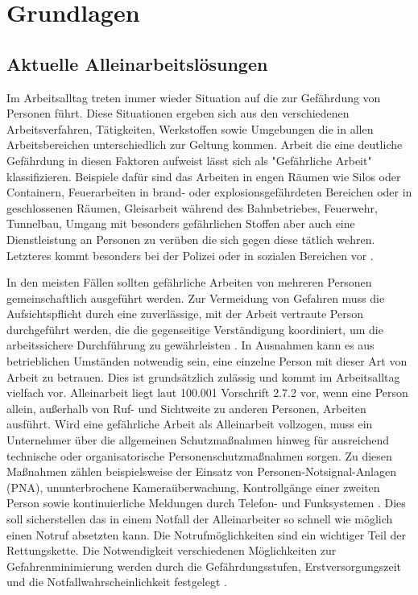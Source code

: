 \documentclass[thesis.tex]{subfiles}
\begin{document}
\chapter{Grundlagen}\label{chap:grundlagen}

\section{Aktuelle Alleinarbeitslösungen}\label{alleinarbeit}

Im Arbeitsalltag treten immer wieder Situation auf die zur Gefährdung von Personen führt.
Diese Situationen ergeben sich aus den verschiedenen Arbeitsverfahren, Tätigkeiten, Werkstoffen sowie Umgebungen die in allen Arbeitsbereichen unterschiedlich zur Geltung kommen.
Arbeit die eine deutliche Gefährdung in diesen Faktoren aufweist lässt sich als "Gefährliche Arbeit" klassifizieren.
Beispiele dafür sind das Arbeiten in engen Räumen wie Silos oder Containern, Feuerarbeiten in brand- oder explosionsgefährdeten Bereichen oder in geschlossenen Räumen, Gleisarbeit während des Bahnbetriebes, Feuerwehr, Tunnelbau, Umgang mit besonders gefährlichen Stoffen aber auch eine Dienstleistung an Personen zu verüben die sich gegen diese tätlich wehren.
Letzteres kommt besonders bei der Polizei oder in sozialen Bereichen vor \cite[vgl. S.41 2.7.1]{Regel_100-001}.

In den meisten Fällen sollten gefährliche Arbeiten von mehreren Personen gemeinschaftlich ausgeführt werden.
Zur Vermeidung von Gefahren muss die Aufsichtspflicht durch eine zuverlässige, mit der Arbeit vertraute Person durchgeführt werden, die die gegenseitige Verständigung koordiniert, um die arbeitssichere Durchführung zu gewährleisten \cite[vgl. §8.1]{Vorschrift1_DGUV}.
In Ausnahmen kann es aus betrieblichen Umständen notwendig sein, eine einzelne Person mit dieser Art von Arbeit zu betrauen. Dies ist grundsätzlich zulässig und kommt im Arbeitsalltag vielfach vor.
Alleinarbeit liegt laut 100.001 Vorschrift 2.7.2 vor, wenn eine Person allein, außerhalb von Ruf- und Sichtweite zu anderen Personen, Arbeiten ausführt.
Wird eine gefährliche Arbeit als Alleinarbeit vollzogen, muss ein Unternehmer über die allgemeinen Schutzmaßnahmen hinweg für ausreichend technische oder organisatorische Personenschutzmaßnahmen sorgen.
Zu diesen Maßnahmen zählen beispielsweise der Einsatz von Personen-Notsignal-Anlagen (PNA), ununterbrochene Kameraüberwachung, Kontrollgänge einer zweiten Person sowie kontinuierliche Meldungen durch Telefon- und Funksystemen \cite[vgl. S.43 2.7.2]{Regel_100-001}.
Dies soll sicherstellen das in einem Notfall der Alleinarbeiter so schnell wie möglich einen Notruf absetzten kann.
Die Notrufmöglichkeiten sind ein wichtiger Teil der Rettungskette.
Die Notwendigkeit verschiedenen Möglichkeiten zur Gefahrenminimierung werden durch die Gefährdungsstufen, Erstversorgungszeit und die Notfallwahrscheinlichkeit festgelegt \cite[vgl. S.13-18]{Regel_112-139}.
\end{document}
